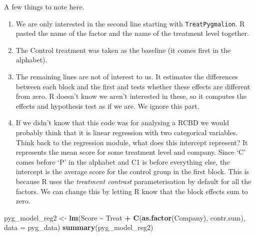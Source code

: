 \documentclass[
  letterpaper,
]{book}
\newenvironment{Shaded}{\begin{snugshade}}{\end{snugshade}}
\newcommand{\AttributeTok}[1]{\textcolor[rgb]{0.13,0.29,0.53}{#1}}
\newcommand{\FunctionTok}[1]{\textcolor[rgb]{0.13,0.29,0.53}{\textbf{#1}}}
\newcommand{\NormalTok}[1]{#1}
\newcommand{\OtherTok}[1]{\textcolor[rgb]{0.56,0.35,0.01}{#1}}
\newcommand{\SpecialCharTok}[1]{\textcolor[rgb]{0.81,0.36,0.00}{\textbf{#1}}}
\begin{document}
A few things to note here.

\begin{enumerate}
\def\labelenumi{\arabic{enumi}.}
\item
  We are only interested in the second line starting with
  \texttt{TreatPygmalion}. R pasted the name of the factor and the name
  of the treatment level together.
\item
  The Control treatment was taken as the baseline (it comes first in the
  alphabet).
\item
  The remaining lines are not of interest to us. It estimates the
  differences between each block and the first and tests whether these
  effects are different from zero. R doesn't know we aren't interested
  in these, so it computes the effects and hypothesis test as if we are.
  We ignore this part.
\item
  If we didn't know that this code was for analysing a RCBD we would
  probably think that it is linear regression with two categorical
  variables. Think back to the regression module, what does this
  intercept represent? It represents the mean score for some treatment
  level and company. Since `C' comes before `P' in the alphabet and C1
  is before everything else, the intercept is the average score for the
  control group in the first block. This is because R uses the
  \emph{treatment contrast} parameterisation by default for all the
  factors. We can change this by letting R know that the block effects
  sum to zero.
\end{enumerate}

\begin{Shaded}
\begin{Highlighting}[]
\NormalTok{pyg\_model\_reg2 }\OtherTok{\textless{}{-}} \FunctionTok{lm}\NormalTok{(Score }\SpecialCharTok{\textasciitilde{}}\NormalTok{ Treat }\SpecialCharTok{+} \FunctionTok{C}\NormalTok{(}\FunctionTok{as.factor}\NormalTok{(Company), contr.sum), }\AttributeTok{data =}\NormalTok{ pyg\_data)}
\FunctionTok{summary}\NormalTok{(pyg\_model\_reg2)}
\end{Highlighting}
\end{Shaded}
\end{document}
